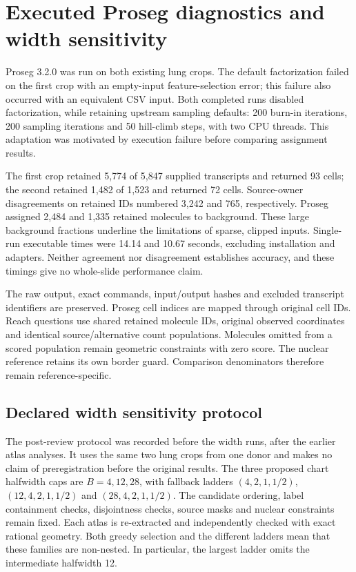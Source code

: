 \section{Executed Proseg diagnostics and width sensitivity}
Proseg 3.2.0 was run on both existing lung crops. The default factorization failed on the first crop with an empty-input feature-selection error; this failure also occurred with an equivalent CSV input. Both completed runs disabled factorization, while retaining upstream sampling defaults: 200 burn-in iterations, 200 sampling iterations and 50 hill-climb steps, with two CPU threads. This adaptation was motivated by execution failure before comparing assignment results.

The first crop retained 5,774 of 5,847 supplied transcripts and returned 93 cells; the second retained 1,482 of 1,523 and returned 72 cells. Source-owner disagreements on retained IDs numbered 3,242 and 765, respectively. Proseg assigned 2,484 and 1,335 retained molecules to background. These large background fractions underline the limitations of sparse, clipped inputs. Single-run executable times were 14.14 and 10.67 seconds, excluding installation and adapters. Neither agreement nor disagreement establishes accuracy, and these timings give no whole-slide performance claim.

The raw output, exact commands, input/output hashes and excluded transcript identifiers are preserved. Proseg cell indices are mapped through original cell IDs. Reach questions use shared retained molecule IDs, original observed coordinates and identical source/alternative count populations. Molecules omitted from a scored population remain geometric constraints with zero score. The nuclear reference retains its own border guard. Comparison denominators therefore remain reference-specific.

\subsection{Declared width sensitivity protocol}
The post-review protocol was recorded before the width runs, after the earlier atlas analyses. It uses the same two lung crops from one donor and makes no claim of preregistration before the original results. The three proposed chart halfwidth caps are $B=4,12,28$, with fallback ladders $(4,2,1,1/2)$, $(12,4,2,1,1/2)$ and $(28,4,2,1,1/2)$. The candidate ordering, label containment checks, disjointness checks, source masks and nuclear constraints remain fixed. Each atlas is re-extracted and independently checked with exact rational geometry. Both greedy selection and the different ladders mean that these families are non-nested. In particular, the largest ladder omits the intermediate halfwidth 12.

